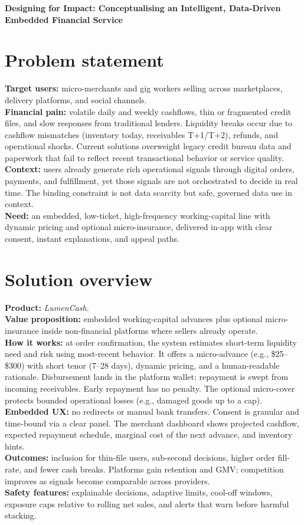 \documentclass[11pt,a4paper]{article}
\begin{document}
\LARGE{\textbf{Designing for Impact: Conceptualising an Intelligent, Data-Driven Embedded Financial Service}}
\normalsize

\section*{Problem statement}
\textbf{Target users:} micro-merchants and gig workers selling across marketplaces, delivery platforms, and social channels.\\
\textbf{Financial pain:} volatile daily and weekly cashflows, thin or fragmented credit files, and slow responses from traditional lenders. Liquidity breaks occur due to cashflow mismatches (inventory today, receivables T{+}1/T{+}2), refunds, and operational shocks. Current solutions overweight legacy credit bureau data and paperwork that fail to reflect recent transactional behavior or service quality.\\
\textbf{Context:} users already generate rich operational signals through digital orders, payments, and fulfillment, yet those signals are not orchestrated to decide in real time. The binding constraint is not data scarcity but safe, governed data use in context.\\
\textbf{Need:} an embedded, low-ticket, high-frequency working-capital line with dynamic pricing and optional micro-insurance, delivered in-app with clear consent, instant explanations, and appeal paths.

\section*{Solution overview}
\textbf{Product:} \emph{LumenCash}.\\
\textbf{Value proposition:} embedded working-capital advances plus optional micro-insurance inside non-financial platforms where sellers already operate.\\
\textbf{How it works:} at order confirmation, the system estimates short-term liquidity need and risk using most-recent behavior. It offers a micro-advance (e.g., \$25--\$300) with short tenor (7--28 days), dynamic pricing, and a human-readable rationale. Disbursement lands in the platform wallet; repayment is swept from incoming receivables. Early repayment has no penalty. The optional micro-cover protects bounded operational losses (e.g., damaged goods up to a cap).\\
\textbf{Embedded UX:} no redirects or manual bank transfers. Consent is granular and time-bound via a clear panel. The merchant dashboard shows projected cashflow, expected repayment schedule, marginal cost of the next advance, and inventory hints.\\
\textbf{Outcomes:} inclusion for thin-file users, sub-second decisions, higher order fill-rate, and fewer cash breaks. Platforms gain retention and GMV; competition improves as signals become comparable across providers.\\
\textbf{Safety features:} explainable decisions, adaptive limits, cool-off windows, exposure caps relative to rolling net sales, and alerts that warn before harmful stacking.
\end{document}
